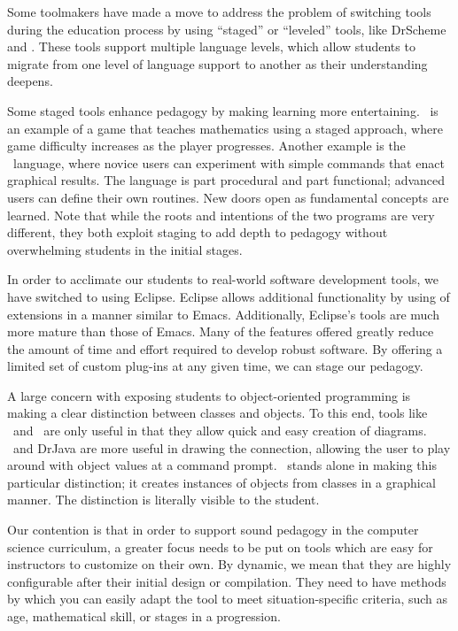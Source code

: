 \documentclass{sig-alt-release}
\begin{document}
  Some toolmakers have made a move to address the problem of switching tools
  during the education process by using ``staged'' or ``leveled'' tools, like
  DrScheme and \drjava. These tools support multiple language levels, which
  allow students to migrate from one level of language support to another as
  their understanding deepens.

  Some staged tools enhance pedagogy by making learning more entertaining.
  \munchers\ is an example of a game that teaches mathematics using a staged
  approach, where game difficulty increases as the player progresses. Another
  example is the \logo\ language, where novice users can experiment with simple
  commands that enact graphical results. The language is part procedural and
  part functional; advanced users can define their own routines. New doors open
  as fundamental concepts are learned. Note that while the roots and intentions
  of the two programs are very different, they both exploit staging to add depth
  to pedagogy without overwhelming students in the initial stages.

  In order to acclimate our students to real-world software development tools,
  we have switched to using Eclipse. Eclipse allows additional functionality
  by using of extensions in a manner similar to Emacs. Additionally, Eclipse's
  tools are much more mature than those of Emacs. Many of the features offered
  greatly reduce the amount of time and effort required to develop robust
  software. By offering a limited set of custom plug-ins at any given time, we
  can stage our pedagogy.

  A large concern with exposing students to object-oriented programming is
  making a clear distinction between classes and objects. To this end, tools
  like \violet\ and \green\ are only useful in that they allow quick and easy
  creation of diagrams. \drscheme\ and DrJava are more useful in drawing the
  connection, allowing the user to play around with object values at a command
  prompt. \bluej\ stands alone in making this particular distinction; it creates
  instances of objects from classes in a graphical manner. The distinction is
  literally visible to the student.

  Our contention is that in order to support sound pedagogy in the computer
  science curriculum, a greater focus needs to be put on tools which are easy
  for instructors to customize on their own. By dynamic, we mean that they are
  highly configurable after their initial design or compilation. They need to
  have methods by which you can easily adapt the tool to meet situation-specific
  criteria, such as age, mathematical skill, or stages in a progression.
\end{document}
